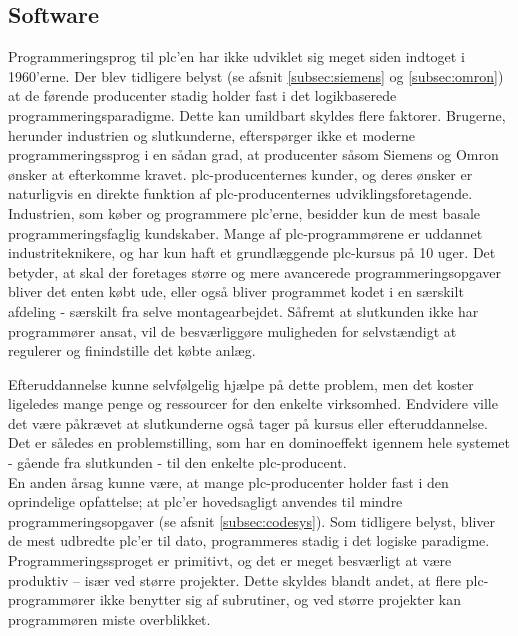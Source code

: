 \subsection{Software}
Programmeringsprog til \gls{plc}'en har ikke udviklet sig meget siden indtoget i 1960'erne. Der blev tidligere belyst (se afsnit \ref{subsec:siemens} og \ref{subsec:omron}) at de førende producenter stadig holder fast i det logikbaserede programmeringsparadigme. Dette kan umildbart skyldes flere faktorer. Brugerne, herunder industrien og slutkunderne, efterspørger ikke et moderne programmeringssprog i en sådan grad, at producenter såsom Siemens og Omron ønsker at efterkomme kravet. \gls{plc}-producenternes kunder, og deres ønsker er naturligvis en direkte funktion af \gls{plc}-producenternes udviklingsforetagende. \\

\noindent Industrien, som køber og programmere \gls{plc}'erne, besidder kun de mest basale programmeringsfaglig kundskaber. Mange af \gls{plc}-programmørene er uddannet industriteknikere, og har kun haft et grundlæggende \gls{plc}-kursus på 10 uger. Det betyder, at skal der foretages større og mere avancerede programmeringsopgaver bliver det enten købt ude, eller også bliver programmet kodet i en særskilt afdeling - særskilt fra selve montagearbejdet. Såfremt at slutkunden ikke har programmører ansat, vil de besværliggøre muligheden for selvstændigt at regulerer og finindstille det købte anlæg. 

Efteruddannelse kunne selvfølgelig hjælpe på dette problem, men det koster ligeledes mange penge og ressourcer for den enkelte virksomhed. Endvidere ville det være påkrævet at slutkunderne også tager på kursus eller efteruddannelse. 
Det er således en problemstilling, som har en dominoeffekt igennem hele systemet - gående fra slutkunden - til den enkelte \gls{plc}-producent. \\

\noindent En anden årsag kunne være, at mange \gls{plc}-producenter holder fast i den oprindelige opfattelse; at \gls{plc}'er hovedsagligt anvendes til mindre programmeringsopgaver (se afsnit \ref{subsec:codesys}). Som tidligere belyst, bliver de mest udbredte \gls{plc}'er til dato, programmeres stadig i det logiske paradigme. Programmeringssproget er primitivt, og det er meget besværligt at være produktiv – især ved større projekter. Dette skyldes blandt andet, at flere \gls{plc}-programmører ikke benytter sig af subrutiner, og ved større projekter kan programmøren miste overblikket. 

